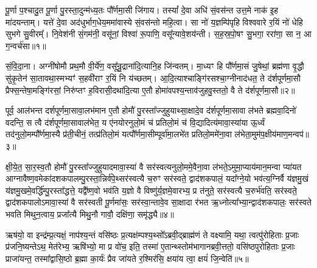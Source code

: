 \setcounter{anuvakam}{0}
पू॒र्णा प॒श्चादु॒त पू॒र्णा पु॒रस्ता॒दुन्म॑ध्य॒तः पौ᳚र्णमा॒सी जि॑गाय। तस्यां᳚ दे॒वा अधि॑ सं॒वस॑न्त उत्त॒मे नाक॑ इ॒ह मा॑दयन्ताम्। यत्ते॑ दे॒वा अद॑धुर्भाग॒धेय॒ममा॑वास्ये सं॒वस॑न्तो महि॒त्वा। सा नो॑ य॒ज्ञम्पि॑पृहि विश्ववारे र॒यिं नो॑ धेहि सुभगे सु॒वीरम्᳚। नि॒वेश॑नी सं॒गम॑नी॒ वसू॑नां॒ विश्वा॑ रू॒पाणि॒ वसू᳚न्यावे॒शय॑न्ती। स॒ह॒स्र॒पो॒षꣳ सु॒भगा॒ ररा॑णा॒ सा न॒ आ ग॒न्वर्च॑सा॥१॥

सं॒वि॒दा॒ना। अग्नी॑षोमौ प्रथ॒मौ वी॒र्ये॑ण॒ वसू᳚न्रु॒द्राना॑दि॒त्यानि॒ह जि॑न्वतम्। मा॒ध्यꣳ हि पौ᳚र्णमा॒सं जु॒षेथां॒ ब्रह्म॑णा वृ॒द्धौ सु॑कृ॒तेन॑ सा॒तावथा॒स्मभ्यꣳ॑ स॒हवी॑राꣳ र॒यिं नि य॑च्छतम्। आ॒दि॒त्याश्चाङ्गि॑रसश्चा॒ग्नीनाद॑धत॒ ते द॑र्\mbox{}शपूर्णमा॒सौ प्रैफ्स॒न्तेषा॒मङ्गि॑रसां॒ निरु॑प्तꣳ ह॒विरासी॒दथा॑दि॒त्या ए॒तौ होमा॑वपश्य॒न्ताव॑जुहवु॒स्ततो॒ वै ते द॑र्\mbox{}शपूर्णमा॒सौ॥२॥

पूर्व॒ आल॑भन्त दर्\mbox{}शपूर्णमा॒सावा॒लभ॑मान ए॒तौ होमौ॑ पु॒रस्ता᳚ज्जुहुयाथ्सा॒क्षादे॒व द॑र्\mbox{}शपूर्णमा॒सावा ल॑भते ब्रह्मवा॒दिनो॑ वदन्ति॒ स त्वै द॑र्\mbox{}शपूर्णमा॒सावाल॑भेत॒ य ए॑नयोरनुलो॒मं च॑ प्रतिलो॒मं च॑ वि॒द्यादित्य॑मावा॒स्या॑या ऊ॒र्ध्वं तद॑नुलो॒म\-म्पौ᳚र्णमा॒स्यै प्र॑ती॒चीनं॒ तत्प्र॑तिलो॒मं यत्पौ᳚र्णमा॒सीम्पूर्वा॑मा॒लभे॑त प्रतिलो॒ममे॑ना॒वा ल॑भेता॒मुम॑प॒क्षीय॑माण॒मन्वप॑॥३॥

क्षी॒ये॒त॒ सा॒र॒स्व॒तौ होमौ॑ पु॒रस्ता᳚ज्जुहुयादमावा॒स्या॑ वै सर॑स्वत्यनुलो॒ममे॒वैना॒वा ल॑भते॒\-ऽमुमा॒प्याय॑मान॒मन्वा प्या॑यत आग्नावैष्ण॒वमेका॑दशकपालम्पु॒रस्ता॒न्निर्व॑पे॒थ्सर॑स्वत्यै च॒रुꣳ सर॑स्वते॒ द्वाद॑शकपालं॒ यदा᳚ग्ने॒यो भव॑त्य॒ग्निर्वै य॑ज्ञमु॒खं य॑ज्ञमु॒खमे॒वर्द्धि॑म्पु॒रस्ता᳚द्धत्ते॒ यद्वै᳚ष्ण॒वो भव॑ति य॒ज्ञो वै विष्णु॑र्य॒ज्ञमे॒वारभ्य॒ प्र त॑नुते॒ सर॑स्वत्यै च॒रुर्भ॑वति॒ सर॑स्वते॒ द्वाद॑शकपालो\-ऽमावा॒स्या॑ वै सर॑स्वती पू॒र्णमा॑सः॒ सर॑स्वा॒न्तावे॒व सा॒क्षादा र॑भत ऋ॒ध्नोत्या᳚भ्या॒न्द्वाद॑शकपालः॒ सर॑स्वते भवति मिथुन॒त्वाय॒ प्रजा᳚त्यै मिथु॒नौ गावौ॒ दक्षि॑णा॒ समृ॑द्ध्यै॥४॥

{}%

ऋष॑यो॒ वा इन्द्र॑म्प्र॒त्यक्षं॒ नाप॑श्य॒न्तं वसि॑ष्ठः प्र॒त्यक्ष॑म्पश्य॒थ्सो᳚\-ऽब्रवी॒द्ब्राह्म॑णं ते वक्ष्यामि॒ यथा॒ त्वत्पु॑रोहिताः प्र॒जाः प्र॑जनि॒ष्यन्ते\-ऽथ॒ मेत॑रेभ्य॒ ऋषि॑भ्यो॒ मा प्र वो॑च॒ इति॒ तस्मा॑ ए॒तान्थ्स्तोम॑भागानब्रवी॒त्ततो॒ वसि॑ष्ठपुरोहिताः प्र॒जाः प्राजा॑यन्त॒ तस्मा᳚द्वासि॒ष्ठो ब्र॒ह्मा का॒र्यः॑ प्रैव जा॑यते र॒श्मिर॑सि॒ क्षया॑य त्वा॒ क्षयं॑ जि॒न्वेति॑॥५॥

